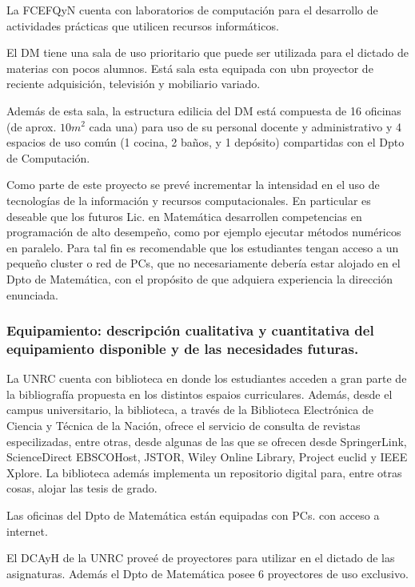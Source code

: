 \documentclass[a4paper, 12pt]{article}
\begin{document}
La FCEFQyN  cuenta con laboratorios de computación para el desarrollo de actividades prácticas que utilicen recursos informáticos. 

 El DM tiene  una sala de uso prioritario que puede ser utilizada para el dictado de materias con pocos alumnos. Está sala esta equipada con ubn proyector de reciente adquisición, televisión y mobiliario variado. 

Además de esta sala, la estructura edilicia del  DM está compuesta de   16 oficinas (de aprox. $10m^2$ cada una) para uso de su personal docente y administrativo y 4 espacios de uso común (1 cocina, 2 baños, y 1 depósito) compartidas con el Dpto de Computación. 


Como parte de este proyecto se prevé incrementar la intensidad en el uso de tecnologías de la información  y recursos computacionales. En particular es deseable que los futuros Lic. en Matemática desarrollen competencias en programación de alto desempeño, como por ejemplo ejecutar métodos numéricos en paralelo. Para tal fin es recomendable que los estudiantes tengan acceso a un pequeño cluster o red de PCs, que no necesariamente debería estar alojado en el Dpto de Matemática, con el propósito de que adquiera experiencia la dirección enunciada. 


\subsubsection{Equipamiento: descripción cualitativa y cuantitativa del equipamiento disponible y de las necesidades futuras.}


La UNRC cuenta con  biblioteca en donde los estudiantes acceden a gran parte de la bibliografía propuesta en los distintos espaios curriculares. Además, desde el campus universitario, la biblioteca, a través de la Biblioteca Electrónica de Ciencia y Técnica de 
la Nación,  ofrece el servicio de consulta de revistas  especilizadas, entre otras, desde algunas de las que se ofrecen desde SpringerLink, ScienceDirect EBSCOHost, JSTOR, Wiley Online Library,  Project euclid y  IEEE Xplore. La biblioteca además implementa un repositorio digital para, entre otras cosas, alojar las tesis de grado. 

Las oficinas del Dpto de Matemática están equipadas con PCs. con acceso a internet.

El DCAyH de la UNRC proveé de proyectores para utilizar en el dictado de las asignaturas. Además el Dpto de Matemática posee 6 proyectores de uso exclusivo.  
\end{document}
